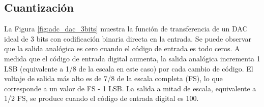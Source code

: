     \begin{table}[h!]
      \caption{Códigos binarios unipolares, convertidor de 4 bits.}
      \begin{center}
      \label{tab:adc_codigos_unipolares}
      \end{center}
    \end{table}

    \subsection{Cuantización}

    La Figura \ref{fig:adc_dac_3bits} muestra la función de transferencia de un DAC ideal de 3 bits con codificación binaria directa en la entrada. Se puede observar que la salida analógica es cero cuando el código de entrada es todo ceros. A medida que el código de entrada digital aumenta, la salida analógica incrementa 1 LSB (equivalente a 1/8 de la escala en este caso) por cada cambio de código. El voltaje de salida más alto es de 7/8 de la escala completa (FS), lo que corresponde a un valor de FS - 1 LSB. La salida a mitad de escala, equivalente a 1/2 FS, se produce cuando el código de entrada digital es 100.


